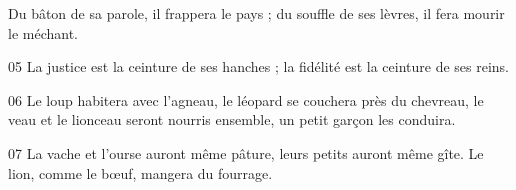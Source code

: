 Du bâton de sa parole, il frappera le pays ; du souffle de ses lèvres, il fera mourir le méchant.

05 La justice est la ceinture de ses hanches ; la fidélité est la ceinture de ses reins.

06 Le loup habitera avec l’agneau, le léopard se couchera près du chevreau, le veau et le lionceau seront nourris ensemble, un petit garçon les conduira.

07 La vache et l’ourse auront même pâture, leurs petits auront même gîte. Le lion, comme le bœuf, mangera du fourrage.
